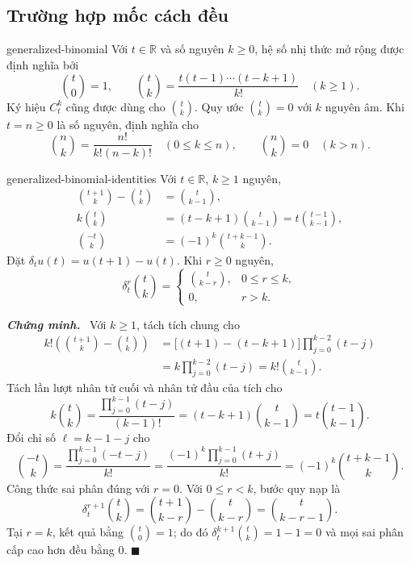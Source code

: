 \documentclass[12pt,a4paper,oneside]{book}
\numberwithin{algorithm}{chapter}
\theoremstyle{definition}
\newenvironment{chungminh}{\par\medskip\noindent\textbf{\textit{\color{mainblue}Chứng minh.}}\ }{\hfill$\blacksquare$\par\medskip}
\newcommand{\R}{\mathbb{R}}
\begin{document}
\subsection{Trường hợp mốc cách đều}
\begin{dinhnghia}{}{generalized-binomial}
Với $t\in\R$ và số nguyên $k\geq0$, hệ số nhị thức mở rộng được định nghĩa bởi
\begin{equation}\label{eq:generalized-binomial}
 \binom t0=1,\qquad
 \binom tk=\frac{t(t-1)\cdots(t-k+1)}{k!}\quad(k\geq1).
\end{equation}
Ký hiệu $C_t^k$ cũng được dùng cho $\binom tk$. Quy ước $\binom tk=0$ với $k$ nguyên âm. Khi $t=n\geq0$ là số nguyên, định nghĩa cho
\[
 \binom nk=\frac{n!}{k!(n-k)!}\quad(0\leq k\leq n),\qquad
 \binom nk=0\quad(k>n).
\]
\end{dinhnghia}

\begin{menhde}{}{generalized-binomial-identities}
Với $t\in\R$, $k\geq1$ nguyên,
\begin{align}
 \binom{t+1}k-\binom tk&=\binom t{k-1},\label{eq:generalized-binomial-pascal}\\
 k\binom tk&=(t-k+1)\binom t{k-1}
 =t\binom{t-1}{k-1},\label{eq:generalized-binomial-recurrence}\\
 \binom{-t}k&=(-1)^k\binom{t+k-1}k.\label{eq:generalized-binomial-negative}
\end{align}
Đặt $\delta_tu(t)=u(t+1)-u(t)$. Khi $r\geq0$ nguyên,
\begin{equation}\label{eq:generalized-binomial-difference}
 \delta_t^r\binom tk=
 \begin{cases}\binom t{k-r},&0\leq r\leq k,\\0,&r>k.\end{cases}
\end{equation}
\end{menhde}
\begin{chungminh}
Với $k\geq1$, tách tích chung cho
\begin{align*}
 k!\left(\binom{t+1}k-\binom tk\right)
 &=\bigl[(t+1)-(t-k+1)\bigr]\prod_{j=0}^{k-2}(t-j)\\
 &=k\prod_{j=0}^{k-2}(t-j)=k!\binom t{k-1}.
\end{align*}
Tách lần lượt nhân tử cuối và nhân tử đầu của tích cho
\[
 k\binom tk
 =\frac{\prod_{j=0}^{k-1}(t-j)}{(k-1)!}
 =(t-k+1)\binom t{k-1}
 =t\binom{t-1}{k-1}.
\]
Đổi chỉ số $\ell=k-1-j$ cho
\[
 \binom{-t}k
 =\frac{\prod_{j=0}^{k-1}(-t-j)}{k!}
 =\frac{(-1)^k\prod_{j=0}^{k-1}(t+j)}{k!}
 =(-1)^k\binom{t+k-1}k.
\]
Công thức sai phân đúng với $r=0$. Với $0\leq r<k$, bước quy nạp là
\[
 \delta_t^{r+1}\binom tk
 =\binom{t+1}{k-r}-\binom t{k-r}
 =\binom t{k-r-1}.
\]
Tại $r=k$, kết quả bằng $\binom t0=1$; do đó $\delta_t^{k+1}\binom tk=1-1=0$ và mọi sai phân cấp cao hơn đều bằng $0$.
\end{chungminh}
\end{document}
